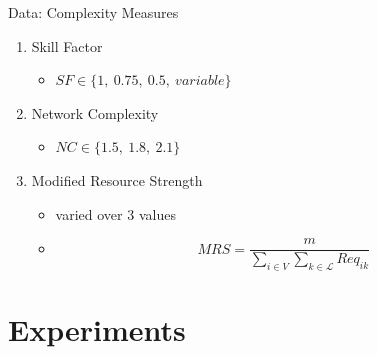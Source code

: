 \documentclass{beamer}
\begin{document}
\begin{frame}{Data: Complexity Measures}
	\begin{enumerate}
		\item Skill Factor
		\vspace{1mm}
		\begin{itemize}
			\item $SF \in \{1,~0.75,~0.5,~variable\}$\pause
		\end{itemize}
		\vspace{2mm}
		\item Network Complexity
		\vspace{1mm}
		\begin{itemize}
			\item $NC \in \{1.5,~1.8,~2.1\}$\pause
		\end{itemize}
		\vspace{2mm}
		\item Modified Resource Strength
		\vspace{1mm}
		\begin{itemize}
			\item varied over 3 values
			\item \[MRS=\frac{m}{\sum_{i\in V}\sum_{k \in \mathscr{L}}Req_{ik}}\]
		\end{itemize}
	\end{enumerate}
\end{frame}


\section{Experiments}
\end{document}
